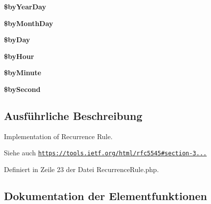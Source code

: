 \begin{DoxyCompactItemize}
{\bfseries \$by\+Year\+Day}
\item 
\mbox{\label{class_eluceo_1_1i_cal_1_1_property_1_1_event_1_1_recurrence_rule_a5d94a3b8378d5e4b2a8d024afca1db02}} 
{\bfseries \$by\+Month\+Day}
\item 
\mbox{\label{class_eluceo_1_1i_cal_1_1_property_1_1_event_1_1_recurrence_rule_ab46a7f0e352a3a8a28c8f3d5efc06a5d}} 
{\bfseries \$by\+Day}
\item 
\mbox{\label{class_eluceo_1_1i_cal_1_1_property_1_1_event_1_1_recurrence_rule_a1f6e674d96a8f53856472a9d4834b3af}} 
{\bfseries \$by\+Hour}
\item 
\mbox{\label{class_eluceo_1_1i_cal_1_1_property_1_1_event_1_1_recurrence_rule_adc24735be86cad78864e4155eca6c6f0}} 
{\bfseries \$by\+Minute}
\item 
\mbox{\label{class_eluceo_1_1i_cal_1_1_property_1_1_event_1_1_recurrence_rule_a257779c461ea4293fd709d526b9623b4}} 
{\bfseries \$by\+Second}
\end{DoxyCompactItemize}


\subsection{Ausführliche Beschreibung}
Implementation of Recurrence Rule.

\begin{DoxySeeAlso}{Siehe auch}
\href{https://tools.ietf.org/html/rfc5545#section-3.8.5.3}{\tt https\+://tools.\+ietf.\+org/html/rfc5545\#section-\/3...} 
\end{DoxySeeAlso}


Definiert in Zeile 23 der Datei Recurrence\+Rule.\+php.



\subsection{Dokumentation der Elementfunktionen}
\mbox{\label{class_eluceo_1_1i_cal_1_1_property_1_1_event_1_1_recurrence_rule_ad1be91dbdcb26d1f931a17758780b2a5}} 
